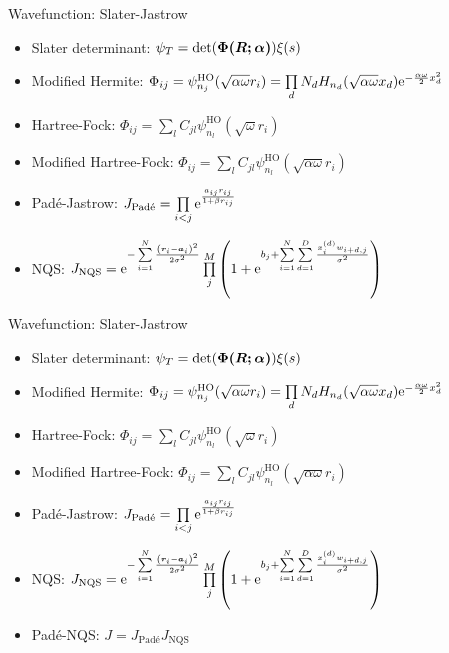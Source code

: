 \documentclass[10pt, t, xcolor=dvipsnames]{beamer}
\begin{document}
\begin{frame}[fragile]{Wavefunction: Slater-Jastrow}
    \begin{itemize}
        \item Slater determinant: $\psi_T =
            \det(\blds{\Phi(\blds{R};\blds{\alpha})}) \xi(s)$
        \item Modified Hermite: $\Phi_{ij} =
            \psi^{\text{HO}}_{n_j}(\sqrt{\alpha\omega}r_i) = \prod\limits_d N_d
            H_{n_d}(\sqrt{\alpha \omega}x_d)\me^{-\frac{\alpha\omega}{2}x^2_d}$
        \item Hartree-Fock: $\Phi_{ij} =
            \sum\limits_lC_{jl}\psi^{\text{HO}}_{n_l}\left(\sqrt{\omega}r_i\right)$
        \item Modified Hartree-Fock: $\Phi_{ij} =
            \sum\limits_lC_{jl}\psi^{\text{HO}}_{n_l}\left(\sqrt{\alpha\omega}r_i\right)$
        \item Pad\'e-Jastrow: $J_{\text{Pad\'e}} = \prod\limits_{i<j}
            \me^{\frac{a_{ij} r_{ij}}{1 + \beta r_{ij}}}$
        \item NQS: $J_{\text{NQS}} = \me^{-\suml{i=1}{N} \frac{\left(\bm{r}_i -
            \bm{a}_i\right)^2}{2\sigma^2}}\prod\limits^{M}_j \left(1 + \me^{b_j
            + \suml{i=1}{N}\suml{d=1}{D}
            \frac{x^{(d)}_iw_{i+d,j}}{\sigma^2}}\right)$
    \end{itemize}
\end{frame}

\begin{frame}[fragile]{Wavefunction: Slater-Jastrow}
    \begin{itemize}
        \item Slater determinant: $\psi_T =
            \det(\blds{\Phi(\blds{R};\blds{\alpha})}) \xi(s)$
        \item Modified Hermite: $\Phi_{ij} =
            \psi^{\text{HO}}_{n_j}(\sqrt{\alpha\omega}r_i) = \prod\limits_d N_d
            H_{n_d}(\sqrt{\alpha \omega}x_d)\me^{-\frac{\alpha\omega}{2}x^2_d}$
        \item Hartree-Fock: $\Phi_{ij} =
            \sum\limits_lC_{jl}\psi^{\text{HO}}_{n_l}\left(\sqrt{\omega}r_i\right)$
        \item Modified Hartree-Fock: $\Phi_{ij} =
            \sum\limits_lC_{jl}\psi^{\text{HO}}_{n_l}\left(\sqrt{\alpha\omega}r_i\right)$
        \item Pad\'e-Jastrow: $J_{\text{Pad\'e}} = \prod\limits_{i<j}
            \me^{\frac{a_{ij} r_{ij}}{1 + \beta r_{ij}}}$
        \item NQS: $J_{\text{NQS}} = \me^{-\suml{i=1}{N} \frac{\left(\bm{r}_i -
            \bm{a}_i\right)^2}{2\sigma^2}}\prod\limits^{M}_j \left(1 + \me^{b_j
            + \suml{i=1}{N}\suml{d=1}{D}
            \frac{x^{(d)}_iw_{i+d,j}}{\sigma^2}}\right)$
        \item Pad\'e-NQS: $J = J_{\text{Pad\'e}}J_{\text{NQS}}$
    \end{itemize}
\end{frame}
\end{document}
